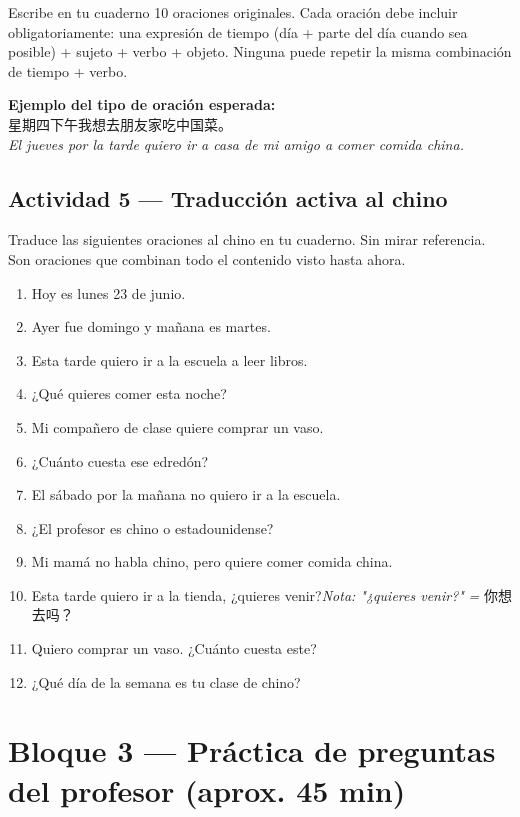 \documentclass[12pt, a4paper]{article}
\begin{document}
Escribe en tu cuaderno 10 oraciones originales. Cada oración debe incluir obligatoriamente: una expresión de tiempo (día + parte del día cuando sea posible) + sujeto + verbo + objeto. Ninguna puede repetir la misma combinación de tiempo + verbo.

\begin{cuadrogris}
\textbf{Ejemplo del tipo de oración esperada:}\\
星期四下午我想去朋友家吃中国菜。\\
\textit{El jueves por la tarde quiero ir a casa de mi amigo a comer comida china.}
\end{cuadrogris}

\subsection{Actividad 5 — Traducción activa al chino}

Traduce las siguientes oraciones al chino en tu cuaderno. Sin mirar referencia. Son oraciones que combinan todo el contenido visto hasta ahora.

\begin{enumerate}[leftmargin=1.5cm]
\item Hoy es lunes 23 de junio.
\item Ayer fue domingo y mañana es martes.
\item Esta tarde quiero ir a la escuela a leer libros.
\item ¿Qué quieres comer esta noche?
\item Mi compañero de clase quiere comprar un vaso.
\item ¿Cuánto cuesta ese edredón?
\item El sábado por la mañana no quiero ir a la escuela.
\item ¿El profesor es chino o estadounidense?
\item Mi mamá no habla chino, pero quiere comer comida china.
\item Esta tarde quiero ir a la tienda, ¿quieres venir?\quad \textit{Nota: "¿quieres venir?"}\textit{ = }{你想去吗？}
\item Quiero comprar un vaso. ¿Cuánto cuesta este?
\item ¿Qué día de la semana es tu clase de chino?
\end{enumerate}

\section{Bloque 3 — Práctica de preguntas del profesor (aprox. 45 min)}
\end{document}
